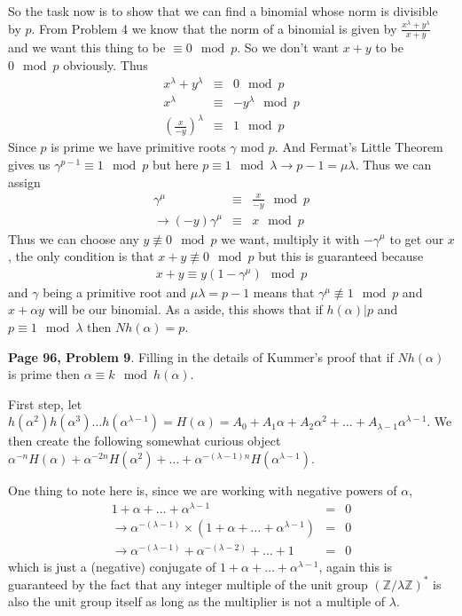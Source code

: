 \documentclass[aps,preprint,preprintnumbers,nofootinbib,showpacs,prd]{revtex4-1}
\newcommand{\nbea}{\begin{eqnarray*}}
\newcommand{\neea}{\end{eqnarray*}}
\begin{document}
So the task now is to show that we can find a binomial whose norm is divisible by $p$. From Problem 4 we know that the norm of a binomial is given by $\frac{x^\lambda + y^\lambda}{x + y}$ and we want this thing to be $\equiv 0 \mod{p}$. So we don't want $x + y$ to be $0 \mod{p}$ obviously. Thus
%
\nbea
x^\lambda + y^\lambda & \equiv & 0 \mod{p} \\
x^\lambda & \equiv & -y^\lambda \mod{p} \\
\left ( \frac{x}{-y} \right )^\lambda & \equiv & 1 \mod{p}
\neea
%
Since $p$ is prime we have primitive roots $\gamma$ mod $p$. And Fermat's Little Theorem gives us $\gamma^{p-1} \equiv 1 \mod{p}$ but here $p \equiv 1 \mod{\lambda} \to p - 1 = \mu\lambda$. Thus we can assign
%
\nbea
\gamma^\mu & \equiv & \frac{x}{-y} \mod{p} \\
\to (-y)\gamma^\mu & \equiv & x \mod{p}
\neea
%
Thus we can choose any $y \not\equiv 0 \mod{p}$ we want, multiply it with $-\gamma^\mu$ to get our $x$, the only condition is that $x + y \not\equiv 0 \mod{p}$ but this is guaranteed because
%
\nbea
x + y \equiv y(1 - \gamma^\mu) \mod{p}
\neea
%
and $\gamma$ being a primitive root and $\mu\lambda = p-1$ means that $\gamma^\mu \not\equiv 1 \mod{p}$ and $x + \alpha y$ will be our binomial. As a aside, this shows that if $h(\alpha)|p$ and $p \equiv 1 \mod{\lambda}$ then $Nh(\alpha) = p$.

{\bf Page 96, Problem 9}. Filling in the details of Kummer's proof that if $Nh(\alpha)$ is prime then $\alpha \equiv k \mod{h(\alpha)}$.

First step, let $h(\alpha^2)h(\alpha^3) \dots h(\alpha^{\lambda-1}) = H(\alpha) = A_0 + A_1 \alpha + A_2 \alpha^2 + \dots + A_{\lambda - 1} \alpha^{\lambda-1}$. We then create the following somewhat curious object $\alpha^{-n}H(\alpha) + \alpha^{-2n}H(\alpha^2) + \dots + \alpha^{-(\lambda - 1)n}H(\alpha^{\lambda - 1})$.

One thing to note here is, since we are working with negative powers of $\alpha$,
%
\nbea
1 + \alpha + \dots + \alpha^{\lambda - 1} & = & 0 \\
\to \alpha^{-(\lambda-1)} \times (1 + \alpha + \dots + \alpha^{\lambda - 1}) & = & 0 \\
\to \alpha^{-(\lambda - 1)} + \alpha^{-(\lambda - 2)} + \dots + 1 & = & 0
\neea
%
which is just a (negative) conjugate of $1 + \alpha + \dots + \alpha^{\lambda - 1}$, again this is guaranteed by the fact that any integer multiple of the unit group $(\mathbb{Z}/\lambda\mathbb{Z})^*$ is also the unit group itself as long as the multiplier is not a multiple of $\lambda$.
\end{document}
